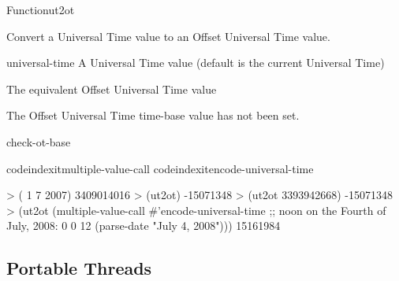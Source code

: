 \documentclass[10pt,twoside,english,pdftex]{article}
\begin{document}

\begin{functiondoc}{Function}{ut2ot}{ 
  \returns{} }
%

\fnsyntax

\fnpurpose Convert a Universal Time value to an Offset Universal Time 
value.

\fnpackage {}

\fnmodule {}

\fnargs
\begin{args}{universal-time}
 A Universal Time value (default is the current
   Universal Time)
\end{args}

\fnreturns The equivalent Offset Universal Time value

\fnerrors The Offset Universal Time time-base value has not been set.

\begin{alsos}{check-ot-base}
\also[*ot-base*]
\also[ot2ut]
\end{alsos}

\fnexamples
%
codeindexit{multiple-value-call}%
codeindexit{encode-universal-time}%
%
\W\supp
\begin{example}
> ( 1 7 2007)
3409014016
> (ut2ot)
-15071348
> (ut2ot 3393942668)
-15071348
> (ut2ot (multiple-value-call #'encode-universal-time 
           ;; noon on the Fourth of July, 2008:
           0 0 12 (parse-date "July 4, 2008")))
15161984
\end{example}

\end{functiondoc}


\T\markright{}%
\T\pagestyle{plain}
\T\clearpage
\W{}
\T\pagestyle{fancy}
\T\thispagestyle{fancybottom}
\T\global\def\fnlastname{ }%

\subsection{Portable Threads}
\label{sec:portablethreads}%


\end{document}
